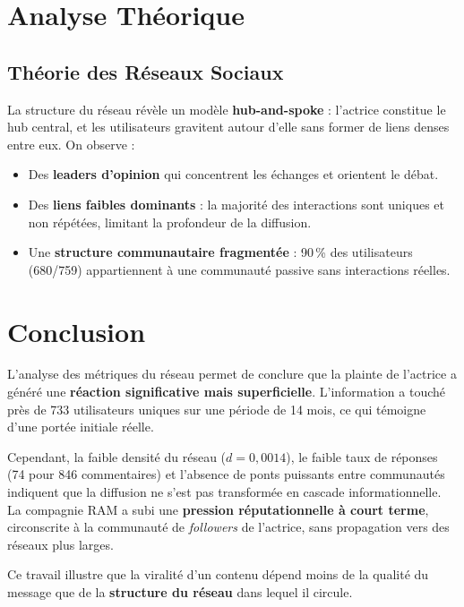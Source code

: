\documentclass[12pt, a4paper]{article}
\begin{document}
\section{Analyse Théorique}

\subsection{Théorie des Réseaux Sociaux}

La structure du réseau révèle un modèle \textbf{hub-and-spoke} : l'actrice constitue
le hub central, et les utilisateurs gravitent autour d'elle sans former de liens denses
entre eux. On observe :

\begin{itemize}
    \item Des \textbf{leaders d'opinion}  qui concentrent les échanges et orientent le débat.
    \item Des \textbf{liens faibles dominants}  : la majorité des
          interactions sont uniques et non répétées, limitant la profondeur de la
          diffusion.
    \item Une \textbf{structure communautaire fragmentée} : 90\,\% des utilisateurs
          (680/759) appartiennent à une communauté passive sans interactions réelles.
\end{itemize}



\section{Conclusion}

L'analyse des métriques du réseau permet de conclure que la plainte de l'actrice a
généré une \textbf{réaction significative mais superficielle}. L'information a touché
près de 733 utilisateurs uniques sur une période de 14 mois, ce qui témoigne d'une
portée initiale réelle.

Cependant, la faible densité du réseau ($d = 0{,}0014$), le faible taux de réponses
(74 pour 846 commentaires) et l'absence de ponts puissants entre communautés indiquent
que la diffusion ne s'est pas transformée en cascade informationnelle. La compagnie RAM
a subi une \textbf{pression réputationnelle à court terme}, circonscrite à la communauté
de \textit{followers} de l'actrice, sans propagation vers des réseaux plus larges.

Ce travail illustre que la viralité d'un contenu dépend moins de la qualité du message
que de la \textbf{structure du réseau} dans lequel il circule.
\end{document}
